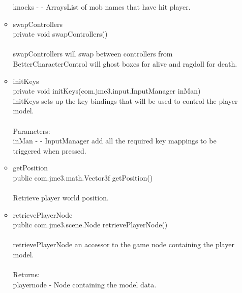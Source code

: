 \documentclass[letterpaper]{article}
\begin{document}
\begin{itemize}
\begin{itemize}
													knocks - - ArraysList of mob names that have hit player. \\
											\item	swapControllers \\
													private void swapControllers() \\ \\
													swapControllers will swap between controllers from BetterCharacterControl will ghost boxes for alive and ragdoll for death. \\
											\item	initKeys \\
													private void initKeys(com.jme3.input.InputManager inMan) \\
													initKeys sets up the key bindings that will be used to control the player model. \\ \\
													Parameters: \\
													inMan - - InputManager add all the required key mappings to be triggered when pressed.
											\item	getPosition \\
													public com.jme3.math.Vector3f getPosition() \\ \\
													Retrieve player world position.
											\item	retrievePlayerNode \\
													public com.jme3.scene.Node retrievePlayerNode() \\ \\
													retrievePlayerNode an accessor to the game node containing the player model. \\ \\
													Returns: \\
													playernode - Node containing the model data.
										\end{itemize}
							\end{itemize}
						
						\vspace{0.2in}
\end{document}
